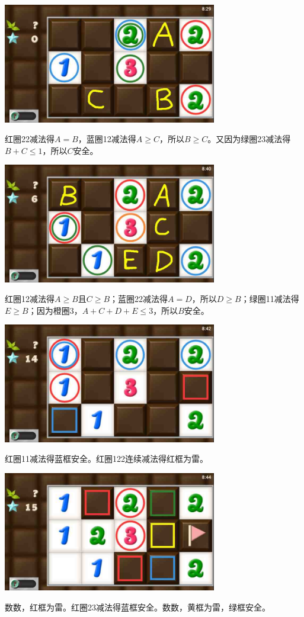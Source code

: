 \subsection{} %
\begin{center}
    \includegraphics[width=0.7\textwidth]{puzzlelow/110-1.jpg}
\end{center}
红圈22减法得$A=B$，蓝圈12减法得$A\ge C$，所以$B\ge C$。又因为绿圈23减法得$B+C\le 1$，所以$C$安全。
\begin{center}
    \includegraphics[width=0.7\textwidth]{puzzlelow/110-2.jpg}
\end{center}
红圈12减法得$A\ge B$且$C\ge B$；蓝圈22减法得$A=D$，所以$D\ge B$；绿圈11减法得$E\ge B$；因为橙圈3，$A+C+D+E\le 3$，所以$B$安全。
\begin{center}
    \includegraphics[width=0.7\textwidth]{puzzlelow/110-3.jpg}
\end{center}
红圈11减法得蓝框安全。红圈122连续减法得红框为雷。
\begin{center}
    \includegraphics[width=0.7\textwidth]{puzzlelow/110-4.jpg}
\end{center}
数数，红框为雷。红圈23减法得蓝框安全。数数，黄框为雷，绿框安全。


